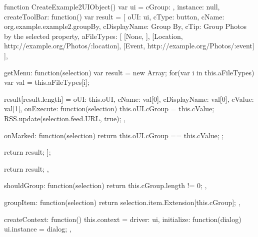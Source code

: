 \documentclass[letterpaper,12pt,english,openany,oneside]{sphinxmanual}
\begin{document}
\begin{sphinxVerbatim}[commandchars=\\\{\}]
function CreateExample2UIObject()
\PYGZob{}
var ui =
\PYGZob{}
   cGroup: \PYGZdq{}\PYGZdq{},
   instance: null,
   createToolBar: function()
   \PYGZob{}
       var result =
       [
           \PYGZob{}
               oUI: ui,
               cType: \PYGZdq{}button\PYGZdq{},
               cName: \PYGZdq{}org.example.example2.groupBy\PYGZdq{},
               cDisplayName: \PYGZdq{}Group By\PYGZdq{},
               cTip: \PYGZdq{}Group Photos by the selected property\PYGZdq{},
               aFileTypes:
               [
                   [\PYGZdq{}None\PYGZdq{}, \PYGZdq{}\PYGZdq{}],
                   [\PYGZdq{}Location\PYGZdq{}, \PYGZdq{}http://example.org/Photos/:location\PYGZdq{}],
                   [\PYGZdq{}Event\PYGZdq{}, \PYGZdq{}http://example.org/Photos/:event\PYGZdq{}]
               ],

               getMenu: function(selection)
               \PYGZob{}
                   var result = new Array;
                   for(var i in this.aFileTypes)
                   \PYGZob{}
                       var val = this.aFileTypes[i];

                       result[result.length] =
                       \PYGZob{}
                           oUI: this.oUI,
                           cName: val[0],
                           cDisplayName: val[0],
                           cValue: val[1],
                           onExecute: function(selection)
                           \PYGZob{}
                               this.oUI.cGroup = this.cValue;
                               RSS.update(selection.feed.URL, true);
                           \PYGZcb{},

                           onMarked: function(selection)
                           \PYGZob{}
                               return this.oUI.cGroup == this.cValue;
                           \PYGZcb{}
                       \PYGZcb{};
                   \PYGZcb{}

                   return result;
               \PYGZcb{}
           \PYGZcb{}
       ];

       return result;
   \PYGZcb{},

   shouldGroup: function(selection)
   \PYGZob{}
       return this.cGroup.length != 0;
   \PYGZcb{},

   groupItem: function(selection)
   \PYGZob{}
       return selection.item.Extension[this.cGroup];
   \PYGZcb{},

   createContext: function()
   \PYGZob{}
       this.context =
       \PYGZob{}
           driver: ui,
           initialize: function(dialog)
           \PYGZob{}
               ui.instance = dialog;
           \PYGZcb{},


\end{sphinxVerbatim}
\end{document}
